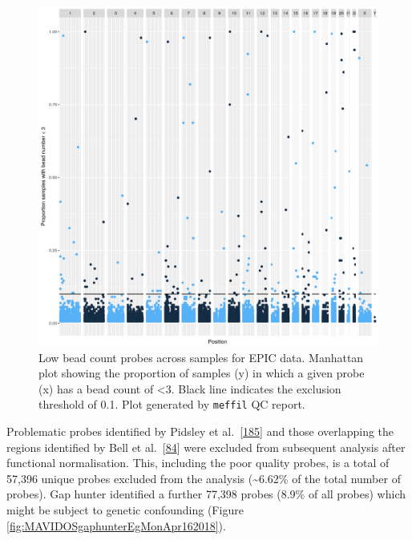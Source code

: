 \documentclass[
]{book}
\begin{document}
\begin{figure}

{\centering \includegraphics[width=0.8\linewidth]{figs/MAVIDOSqcEPICbeadNumAcross} 

}

\caption{Low bead count probes across samples for EPIC data. Manhattan plot showing the proportion of samples (y) in which a given probe (x) has a bead count of \textless3. Black line indicates the exclusion threshold of 0.1. Plot generated by \texttt{meffil} QC report.}\label{fig:MAVIDOSqcEPICbeadNumAcross}
\end{figure}



Problematic probes identified by Pidsley et al.~{[}\protect\hyperlink{ref-Pidsley2016}{185}{]} and those overlapping the regions identified by Bell et al.~{[}\protect\hyperlink{ref-Bell2017a}{84}{]} were excluded from subsequent analysis after functional normalisation.
This, including the poor quality probes, is a total of 57,396 unique probes excluded from the analysis (\textasciitilde6.62\% of the total number of probes).
Gap hunter identified a further 77,398 probes (8.9\% of all probes) which might be subject to genetic confounding (Figure \ref{fig:MAVIDOSgaphunterEgMonApr162018}).
\end{document}
